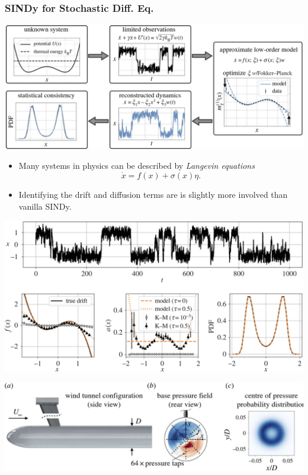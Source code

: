 \documentclass[aspectratio=169,compress,12pt]{beamer}
\begin{document}
\begin{frame}
    \frametitle{SINDy for Stochastic Diff. Eq.}
    \vfill
    \begin{minipage}{.48\textwidth}
        \includegraphics[width=\textwidth]{imgs/langevin_regression_one.png}
    \end{minipage}%
    \hfill
    \begin{minipage}{.48\textwidth}
        \begin{itemize}
            \item Many systems in physics can be described by \emph{Langevin equations}
            \[
            \dot{x} = f(x) + \sigma(x) \eta.
            \]
            \item Identifying the drift and diffusion terms are is slightly more involved than vanilla SINDy.
        \end{itemize}
    \end{minipage}
    \vfill
\end{frame}

\begin{frame}
    \vfill
    \centering
    \includegraphics[width=\textwidth]{imgs/langevin_regression_three.png}
    \vfill
\end{frame}

\begin{frame}
    \vfill
    \centering
    \includegraphics[width=\textwidth]{imgs/langevin_regression_four.png}
    \vfill
\end{frame}
\end{document}
